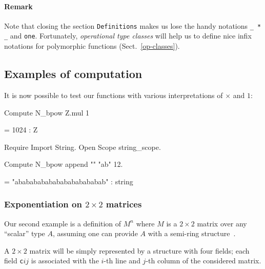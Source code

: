 \paragraph*{Remark}
Note that closing the section \texttt{Definitions} makes us lose the
handy notations \texttt{\_ * \_} and \texttt{one}. Fortunately, \emph{operational type classes} will help us to define nice infix notations for polymorphic functions (Sect.~\vref{op-classes}).

\subsection{Examples of computation}
It is now possible to test our functions with various interpretations of
$\times$ and $1$:

\begin{Coqsrc}
Compute N_bpow Z.mul 1%
\end{Coqsrc}

\begin{Coqanswer}
 = 1024%
     : Z 
\end{Coqanswer}


\begin{Coqsrc}
Require Import String.
Open Scope string_scope.

Compute N_bpow append "" "ab"  12.
\end{Coqsrc}

\begin{Coqanswer}
  = "abababababababababababab"
     : string 
\end{Coqanswer}
    




\subsubsection{Exponentiation on $2\times 2$ matrices}
\label{naive-matrix}
Our second example is a definition of $M^n$ where $M$ is a $2\times 2$ matrix
over any ``scalar''  type $A$, assuming one can provide $A$ with a semi-ring structure~\cite{Coq}.



A $2\times 2$ matrix will be simply represented by a structure with four fields;
each field \texttt{c$ij$} is associated with the $i$-th line and $j$-th column of the considered matrix.

